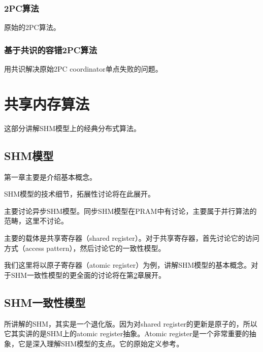 \documentclass[UTF8]{ctexrep}
\begin{document}
\section{2PC算法}

原始的2PC算法。

\section{基于共识的容错2PC算法}

用共识解决原始2PC coordinator单点失败的问题。

\part{共享内存算法}

这部分讲解SHM模型上的经典分布式算法。

\chapter{SHM模型} \label{Chap_SHM}

第一章主要是介绍基本概念。

SHM模型的技术细节，拓展性讨论将在此展开。

主要讨论异步SHM模型。同步SHM模型在PRAM中有讨论，主要属于并行算法的范畴，这里不讨论。

主要的载体是共享寄存器（shared register）。对于共享寄存器，首先讨论它的访问方式（access pattern），然后讨论它的一致性模型。

我们这里将以原子寄存器（atomic register）为例，讲解SHM模型的基本概念。对于SHM一致性模型的更全面的讨论将在第\ref{Chap_SHM-Consis}章展开。


\chapter{SHM一致性模型} \label{Chap_SHM-Consis}

\cite[Chap 4]{Attiya04}所讲解的SHM，其实是一个退化版。因为对shared register的更新是原子的，所以它其实讲的是SHM上的atomic register抽象。Atomic register是一个非常重要的抽象，它是深入理解SHM模型的支点。它的原始定义参考\cite{Lamport86a, Lamport86b}。
\end{document}
